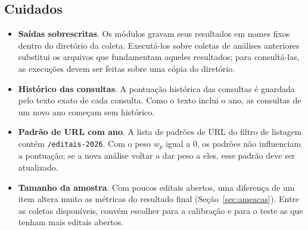 \subsection{Cuidados}

\begin{itemize}
  \item \textbf{Saídas sobrescritas}. Os módulos gravam seus resultados em
    nomes fixos dentro do diretório da coleta. Executá-los sobre coletas de
    análises anteriores substitui os arquivos que fundamentam aqueles
    resultados; para consultá-las, as execuções devem ser feitas sobre uma
    cópia do diretório.
  \item \textbf{Histórico das consultas}. A pontuação histórica das consultas é
    guardada pelo texto exato de cada consulta. Como o texto inclui o ano, as
    consultas de um novo ano começam sem histórico.
  \item \textbf{Padrão de URL com ano}. A lista de padrões de URL do filtro de
    listagem contém \texttt{/editais-2026}. Com o peso $w_p$ igual a 0, os
    padrões não influenciam a pontuação; se a nova análise voltar a dar peso a
    eles, esse padrão deve ser atualizado.
  \item \textbf{Tamanho da amostra}. Com poucos editais abertos, uma diferença
    de um item altera muito as métricas do resultado final
    (Seção~\ref{sec:ameacas}). Entre as coletas disponíveis, convém escolher
    para a calibração e para o teste as que tenham mais editais abertos.
\end{itemize}
